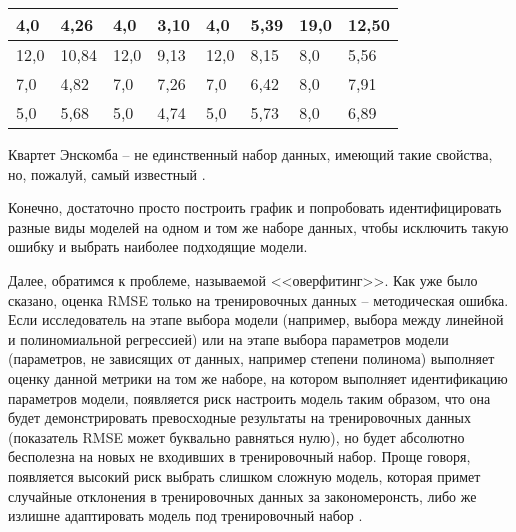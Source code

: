 \begin{table}[!htp]
\begin{tabular}{|ll|ll|ll|ll|}
			\multicolumn{1}{|l|}{4,0}  & 4,26                   & \multicolumn{1}{l|}{4,0}  & 3,10                   & \multicolumn{1}{l|}{4,0}  & 5,39                   & \multicolumn{1}{l|}{19,0} & 12,50                  \\ \hline
			\multicolumn{1}{|l|}{12,0} & 10,84                  & \multicolumn{1}{l|}{12,0} & 9,13                   & \multicolumn{1}{l|}{12,0} & 8,15                   & \multicolumn{1}{l|}{8,0}  & 5,56                   \\ \hline
			\multicolumn{1}{|l|}{7,0}  & 4,82                   & \multicolumn{1}{l|}{7,0}  & 7,26                   & \multicolumn{1}{l|}{7,0}  & 6,42                   & \multicolumn{1}{l|}{8,0}  & 7,91                   \\ \hline
			\multicolumn{1}{|l|}{5,0}  & 5,68                   & \multicolumn{1}{l|}{5,0}  & 4,74                   & \multicolumn{1}{l|}{5,0}  & 5,73                   & \multicolumn{1}{l|}{8,0}  & 6,89                   \\ \hline
		\end{tabular}
		\label{table:anscombe_quartet}
	\end{table}

	Квартет Энскомба -- не единственный набор данных, имеющий такие свойства, 
	но, пожалуй, самый известный \cite{anscombe_quartet_wikipedia}. 

	Конечно, достаточно просто построить график и попробовать идентифицировать
	разные виды моделей на одном и том же наборе данных, чтобы исключить такую
	ошибку и выбрать наиболее подходящие модели.

	
	Далее, обратимся к проблеме, называемой <<оверфитинг>>. Как уже было 
	сказано, оценка RMSE только на тренировочных данных -- методическая ошибка. 
	Если исследователь на этапе выбора модели (например, выбора между линейной
	и полиномиальной регрессией) или на этапе выбора параметров модели 
	(параметров, не зависящих от данных, например степени полинома) выполняет
	оценку данной метрики на том же наборе, на котором выполняет идентификацию 
	параметров модели, появляется риск настроить модель таким образом, что она 
	будет демонстрировать превосходные результаты на тренировочных данных 
	(показатель RMSE может буквально равняться нулю), но будет абсолютно 
	бесполезна на новых не входивших в тренировочный набор. Проще говоря, 
	появляется высокий риск выбрать слишком сложную модель, которая примет 
	случайные отклонения в тренировочных данных за закономеронсть, либо же 
	излишне адаптировать модель под тренировочный набор	
	\cite{hands_on_ml, nikolenko_deep_learning}.

